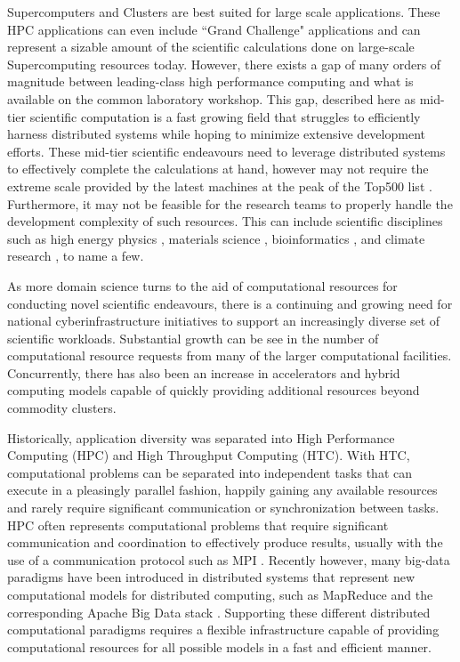 Supercomputers and Clusters are best suited for large scale applications.  These HPC applications can even include ``Grand Challenge" applications \cite{hoare2005grand} and can represent a sizable amount of the scientific calculations done on large-scale Supercomputing resources today. However, there exists a gap of many orders of magnitude  between leading-class high performance computing and what is available on the common laboratory workshop. This gap, described here as mid-tier scientific computation is a fast growing field that struggles to efficiently harness distributed systems while hoping to minimize extensive development efforts. These mid-tier scientific endeavours need to leverage distributed systems to effectively complete the calculations at hand, however may not require the extreme scale provided by the latest machines at the peak of the Top500 list \cite{www-top500}. Furthermore, it may not be feasible for the research teams to properly handle the development complexity of such resources.  This can include scientific disciplines such as high energy physics \cite{buncic2010cernvm}, materials science \cite{wang2006survey}, bioinformatics \cite{menon2012cloud}, and climate research \cite{He2010nasa}, to name a few.  


As more domain science turns to the aid of computational resources for conducting novel scientific endeavours, there is a continuing and growing need for national cyberinfrastructure initiatives to support an increasingly diverse set of scientific workloads. Substantial growth can be see in the number of computational resource requests \cite{towns2014xsede, antypas2008nersc} from many of the larger computational facilities.  Concurrently, there has also been an increase in accelerators and hybrid computing models capable of quickly providing additional resources \cite{vetter2011keeneland} beyond commodity clusters.

Historically, application diversity was separated into High Performance Computing (HPC) and High Throughput Computing (HTC).  With HTC, computational problems can be separated into independent tasks that can execute in a pleasingly parallel fashion, happily gaining any available resources and rarely require significant communication or synchronization between tasks. HPC often represents computational problems that require significant communication and coordination to effectively produce results, usually with the use of a communication protocol such as MPI \cite{mpi}.  Recently however, many big-data paradigms \cite{agrawal2011big} have been introduced in distributed systems that represent new computational models for distributed computing, such as MapReduce \cite{dean2008mapreduce} and the corresponding Apache Big Data stack \cite{Jha2014apache}. Supporting these different distributed computational paradigms requires a flexible infrastructure capable of providing computational resources for all possible models in a fast and efficient manner. 

